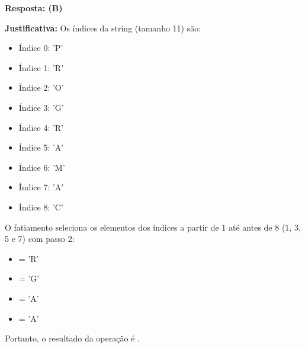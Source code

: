 \ifmostrarGabarito
\textbf{Resposta: (B)}

\textbf{Justificativa:}
Os índices da string  (tamanho 11) são:
\begin{itemize}
    \item Índice 0: 'P'
    \item Índice 1: 'R'
    \item Índice 2: 'O'
    \item Índice 3: 'G'
    \item Índice 4: 'R'
    \item Índice 5: 'A'
    \item Índice 6: 'M'
    \item Índice 7: 'A'
    \item Índice 8: 'C'
\end{itemize}

O fatiamento  seleciona os elementos dos índices a partir de 1 até antes de 8 (1, 3, 5 e 7) com passo 2:
\begin{itemize}
    \item {} = 'R'
    \item {} = 'G'
    \item {} = 'A'
    \item {} = 'A'
\end{itemize}
Portanto, o resultado da operação é .

\fi
